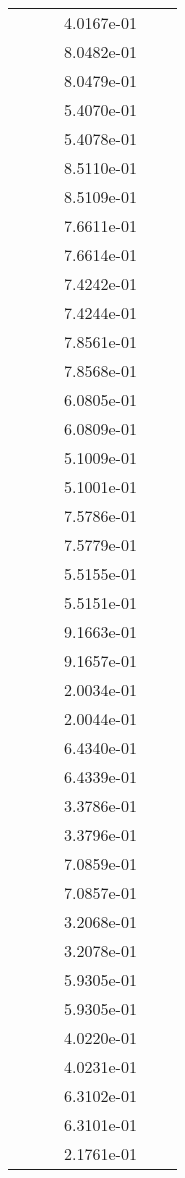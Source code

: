 \begin{xltabular}{\textwidth}{r|rS[table-format=1.3e+2]S[table-format=1.4e+2]S[table-format=1.4e+2]S[table-format=-1.5]}
&  &  & 4.0167e-01 & & \\
&  &  & 8.0482e-01 & & \\
&  &  & 8.0479e-01 & & \\
&  &  & 5.4070e-01 & & \\
&  &  & 5.4078e-01 & & \\
&  &  & 8.5110e-01 & & \\
&  &  & 8.5109e-01 & & \\
&  &  & 7.6611e-01 & & \\
&  &  & 7.6614e-01 & & \\
&  &  & 7.4242e-01 & & \\
&  &  & 7.4244e-01 & & \\
&  &  & 7.8561e-01 & & \\
&  &  & 7.8568e-01 & & \\
&  &  & 6.0805e-01 & & \\
&  &  & 6.0809e-01 & & \\
&  &  & 5.1009e-01 & & \\
&  &  & 5.1001e-01 & & \\
&  &  & 7.5786e-01 & & \\
&  &  & 7.5779e-01 & & \\
&  &  & 5.5155e-01 & & \\
&  &  & 5.5151e-01 & & \\
&  &  & 9.1663e-01 & & \\
&  &  & 9.1657e-01 & & \\
&  &  & 2.0034e-01 & & \\
&  &  & 2.0044e-01 & & \\
&  &  & 6.4340e-01 & & \\
&  &  & 6.4339e-01 & & \\
&  &  & 3.3786e-01 & & \\
&  &  & 3.3796e-01 & & \\
&  &  & 7.0859e-01 & & \\
&  &  & 7.0857e-01 & & \\
&  &  & 3.2068e-01 & & \\
&  &  & 3.2078e-01 & & \\
&  &  & 5.9305e-01 & & \\
&  &  & 5.9305e-01 & & \\
&  &  & 4.0220e-01 & & \\
&  &  & 4.0231e-01 & & \\
&  &  & 6.3102e-01 & & \\
&  &  & 6.3101e-01 & & \\
&  &  & 2.1761e-01 & & \\

\end{xltabular}

